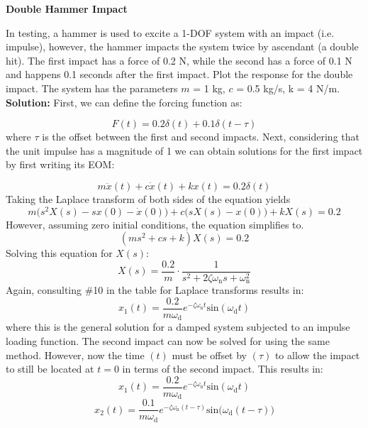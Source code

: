 \documentclass[12pt,letter]{article}
\begin{document}
\begin{example}
\label{example:Double_Hammer_Impact}
	\textbf{Double Hammer Impact}

	\noindent In testing, a hammer is used to excite a 1-DOF system with an impact (i.e. impulse), however, the hammer impacts the system twice by ascendant (a double hit). The first impact has a force of 0.2 N, while the second has a force of 0.1 N and happens 0.1 seconds after the first impact. Plot the response for the double impact. The system has the parameters $m$ = 1 kg, $c$ = 0.5 kg/s, k = 4 N/m. \\
	
	\noindent\textbf{Solution:} 
	\noindent First, we can define the forcing function as:
	
	\begin{equation}
		F(t) = 0.2 \delta (t) + 0.1 \delta(t-\tau)
	\end{equation}
	where $\tau$ is the offset between the first and second impacts. Next, considering that the unit impulse has a magnitude of 1 we can obtain solutions for the first impact by first writing its EOM:
	
	\begin{equation}
		m\ddot{x}(t) +c\dot{x}(t) +kx(t) =0.2 \delta(t)
	\end{equation}
	Taking the Laplace transform of both sides of the equation yields 
	\begin{equation}
		m\big(s^2X(s)-sx(0) - \dot{x}(0)\big) + c\big(sX(s)-x(0)\big) +kX(s) = 0.2
	\end{equation}
	However, assuming zero initial conditions, the equation simplifies to. 
	\begin{equation}
		(ms^2 + cs +k)X(s) = 0.2
	\end{equation}
	Solving this equation for $X(s)$:
	\begin{equation}
		X(s) = \frac{0.2}{m} \cdot \frac{1}{s^2 + 2 \zeta \omega_\text{n} s + \omega_\text{n}^2}
	\end{equation}
	Again, consulting \#10 in the table for Laplace transforms results in:
	\begin{equation}
		x_1(t) = \frac{0.2}{m \omega_\text{d}} e^{-\zeta \omega_\text{n} t} \text{sin}(\omega_\text{d}t)
	\end{equation}
	where this is the general solution for a damped system subjected to an impulse loading function. The second impact can now be solved for using the same method. However, now the time $(t)$ must be offset by $(\tau)$ to allow the impact to still be located at $t=0$ in terms of the second impact. This results in:
	\begin{equation}
		x_1(t) = \frac{0.2}{m \omega_\text{d}} e^{-\zeta \omega_\text{n} t} \text{sin}(\omega_\text{d}t)
	\end{equation}
	\begin{equation}
		x_2(t) = \frac{0.1}{m \omega_\text{d}} e^{-\zeta \omega_\text{n} (t-\tau)} \text{sin}\big(\omega_\text{d}(t-\tau)\big)
	\end{equation}


\end{example}
\end{document}
